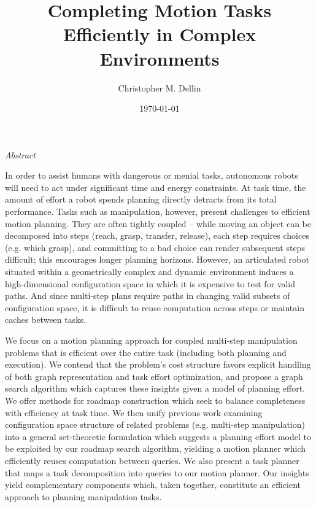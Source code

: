 \documentclass[nobib]{tufte-book}
\title{Completing Motion Tasks Efficiently in Complex Environments}
\author{Christopher M. Dellin}
\date{\today}
\newcommand{\cdnote}[1]{{\xxnote{CD}{blue}{#1}}}
\newcommand{\xxnote}[3]{}
\renewcommand{\xxnote}[3]{\color{#2}{#1: #3}}
\begin{document}
\maketitle

\begin{fullwidth}
\begin{adjustwidth}{1in}{1in}

{\LARGE \emph{Abstract}}

\vspace{0.2in}

\cdnote{I need to rewrite this -- while multi-step tasks
(e.g. arising from manipulation problems) are a well-suited application,
I think the thesis contributions are more broadly applicable.}

In order to assist humans
with dangerous or menial tasks,
autonomous robots will need to
act under significant time and energy constraints.
At task time,
the amount of effort a robot spends planning directly
detracts from its total performance.
Tasks such as manipulation, however, present challenges
to efficient motion planning.
They are often tightly coupled --
while moving an object can be decomposed into
steps (reach, grasp, transfer, release),
each step requires choices (e.g. which grasp),
and committing to a bad choice
can render subsequent steps difficult;
this encourages longer planning horizons.
However,
an articulated robot
situated within a geometrically complex and dynamic environment
induces a high-dimensional configuration space
in which it is expensive to test for valid paths.
And since multi-step plans
require paths in changing valid subsets of configuration space,
it is difficult to reuse computation across steps
or maintain caches between tasks.

We focus on a motion planning approach for coupled multi-step
manipulation problems that is efficient over the entire task
(including both planning and execution).
We contend that the problem's cost structure
favors explicit handling of
both graph representation and task effort optimization,
and propose a graph search algorithm which captures these insights
given a model of planning effort.
We offer methods for roadmap construction
which seek to balance completeness with efficiency at task time.
We then unify previous work examining configuration space structure of
related problems (e.g. multi-step manipulation)
into a general set-theoretic formulation
which suggests a planning effort model
to be exploited by our roadmap search algorithm,
yielding a motion planner which
efficiently reuses computation between queries.
We also present a task planner
that maps a task decomposition into queries to our motion planner.
Our insights yield complementary components
which, taken together,
constitute an efficient approach to planning manipulation tasks.


\end{adjustwidth}
\end{fullwidth}
\end{document}
